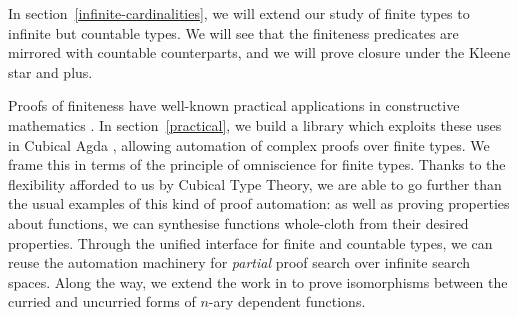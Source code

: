 In section~\ref{infinite-cardinalities}, we will extend our study of finite
types to infinite but countable types.
We will see that the finiteness predicates are mirrored with countable
counterparts, and we will prove closure under the Kleene star and plus.

Proofs of finiteness have well-known practical applications in
constructive mathematics \cite{firsovDependentlyTypedProgramming2015}.
In section~\ref{practical}, we build a library which exploits these uses in
Cubical Agda \cite{vezzosiCubicalAgdaDependently2019}, allowing automation of
complex proofs over finite types.
We frame this in terms of the principle of omniscience for finite types.
Thanks to the flexibility afforded to us by Cubical Type Theory, we are able to
go further than the usual examples of this kind of proof automation: as well as
proving properties about functions, we can synthesise functions whole-cloth from
their desired properties.
Through the unified interface for finite and countable types, we can
reuse the automation machinery for \emph{partial} proof search over infinite
search spaces.
Along the way, we extend the work in \cite{allaisGenericLevelPolymorphic2019} to
prove isomorphisms between the curried and uncurried forms of \(n\)-ary
dependent functions.
